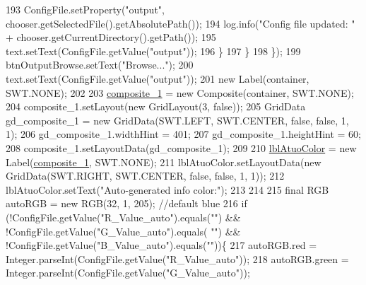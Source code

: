 \begin{DoxyCode}
193                     ConfigFile.setProperty(\textcolor{stringliteral}{"output"}, chooser.getSelectedFile().getAbsolutePath());
194                     log.info(\textcolor{stringliteral}{"Config file updated: "} + chooser.getCurrentDirectory().getPath());
195                     text.setText(ConfigFile.getValue(\textcolor{stringliteral}{"output"}));
196                 \}
197             \}
198         \});
199         btnOutputBrowse.setText(\textcolor{stringliteral}{"Browse..."});
200         text.setText(ConfigFile.getValue(\textcolor{stringliteral}{"output"}));
201         \textcolor{keyword}{new} Label(container, SWT.NONE);
202         
203         \hyperlink{classit_1_1isislab_1_1masonhelperdocumentation_1_1mason_1_1wizards_1_1_b___project_information_page_ad2438c6d59f23f0717a1503f4e823bb8}{composite\_1} = \textcolor{keyword}{new} Composite(container, SWT.NONE);
204         composite\_1.setLayout(\textcolor{keyword}{new} GridLayout(3, \textcolor{keyword}{false}));
205         GridData gd\_composite\_1 = \textcolor{keyword}{new} GridData(SWT.LEFT, SWT.CENTER, \textcolor{keyword}{false}, \textcolor{keyword}{false}, 1, 1);
206         gd\_composite\_1.widthHint = 401;
207         gd\_composite\_1.heightHint = 60;
208         composite\_1.setLayoutData(gd\_composite\_1);
209         
210         \hyperlink{classit_1_1isislab_1_1masonhelperdocumentation_1_1mason_1_1wizards_1_1_b___project_information_page_ad2466b872ca5a35c8341d6e725036bf2}{lblAtuoColor} = \textcolor{keyword}{new} Label(\hyperlink{classit_1_1isislab_1_1masonhelperdocumentation_1_1mason_1_1wizards_1_1_b___project_information_page_ad2438c6d59f23f0717a1503f4e823bb8}{composite\_1}, SWT.NONE);
211         lblAtuoColor.setLayoutData(\textcolor{keyword}{new} GridData(SWT.RIGHT, SWT.CENTER, \textcolor{keyword}{false}, \textcolor{keyword}{false}, 1, 1));
212         lblAtuoColor.setText(\textcolor{stringliteral}{"Auto-generated info color:"});
213 
214         
215         \textcolor{keyword}{final} RGB autoRGB = \textcolor{keyword}{new} RGB(32, 1, 205);    \textcolor{comment}{//default blue}
216         \textcolor{keywordflow}{if} (!ConfigFile.getValue(\textcolor{stringliteral}{"R\_Value\_auto"}).equals(\textcolor{stringliteral}{""}) && !ConfigFile.getValue(\textcolor{stringliteral}{"G\_Value\_auto"}).equals(\textcolor{stringliteral}{
      ""}) && !ConfigFile.getValue(\textcolor{stringliteral}{"B\_Value\_auto"}).equals(\textcolor{stringliteral}{""}))\{
217             autoRGB.red = Integer.parseInt(ConfigFile.getValue(\textcolor{stringliteral}{"R\_Value\_auto"}));
218             autoRGB.green = Integer.parseInt(ConfigFile.getValue(\textcolor{stringliteral}{"G\_Value\_auto"}));

\end{DoxyCode}
